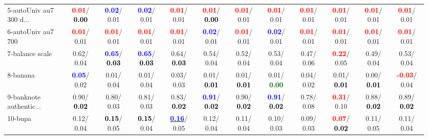\begin{table}[h]
\begin{center}
{\begin{tabular}{lc|c|c|c|c|c|c|c|c|c|c}
5-autoUniv au7 300 d... & \textcolor{red}{\textbf{  0.01}}/\textcolor{black}{\textbf{  0.00}} & \textcolor{blue}{\textbf{  0.02}}/  0.01 & \textcolor{blue}{\textbf{  0.02}}/  0.01 & \textcolor{red}{\textbf{  0.01}}/  0.01 & \textcolor{red}{\textbf{  0.01}}/\textcolor{black}{\textbf{  0.00}} & \textcolor{red}{\textbf{  0.01}}/  0.01 & \textcolor{red}{\textbf{  0.01}}/  0.01 & \textcolor{red}{\textbf{  0.01}}/  0.01 & \textcolor{red}{\textbf{  0.01}}/  0.01 & \textcolor{red}{\textbf{  0.01}}/  0.01 & \textcolor{red}{\textbf{  0.01}}/  0.01 \\
6-autoUniv au7 700 & \textcolor{red}{\textbf{  0.01}}/  0.01 & \textcolor{red}{\textbf{  0.01}}/  0.01 & \textcolor{red}{\textbf{  0.01}}/  0.01 & \textcolor{red}{\textbf{  0.01}}/  0.01 & \textcolor{blue}{\textbf{  0.02}}/  0.01 & \textcolor{red}{\textbf{  0.01}}/  0.01 & \textcolor{blue}{\textbf{  0.02}}/  0.01 & \textcolor{red}{\textbf{  0.01}}/  0.01 & \textcolor{red}{\textbf{  0.01}}/  0.01 & \textcolor{red}{\textbf{  0.01}}/  0.01 & \textcolor{red}{\textbf{  0.01}}/  0.01 \\
7-balance scale &   0.62/  0.04 & \textcolor{blue}{\textbf{  0.65}}/\textcolor{black}{\textbf{  0.03}} & \textcolor{blue}{\textbf{  0.65}}/\textcolor{black}{\textbf{  0.03}} &   0.64/\textcolor{black}{\textbf{  0.03}} &   0.54/  0.04 &   0.52/  0.04 &   0.53/  0.04 &   0.47/  0.06 & \textcolor{red}{\textbf{  0.22}}/  0.05 &   0.49/  0.04 &   0.53/  0.04 \\ \hline
8-banana & \textcolor{blue}{\textbf{  0.05}}/  0.02 &   0.01/  0.04 &   0.01/  0.04 &   0.03/  0.03 &   0.01/\textcolor{black}{\textbf{  0.01}} &   0.01/\textcolor{black}{\textbf{  0.01}} &   0.01/\textcolor{darkgreen}{\textbf{  0.00}} &   0.04/  0.02 &   0.01/\textcolor{black}{\textbf{  0.01}} &   0.00/\textcolor{black}{\textbf{  0.01}} & \textcolor{red}{\textbf{ -0.03}}/  0.04 \\
9-banknote authentic... &   0.90/\textcolor{black}{\textbf{  0.02}} &   0.80/  0.03 &   0.81/  0.03 &   0.83/\textcolor{black}{\textbf{  0.02}} & \textcolor{blue}{\textbf{  0.91}}/\textcolor{black}{\textbf{  0.02}} &   0.90/\textcolor{black}{\textbf{  0.02}} & \textcolor{blue}{\textbf{  0.91}}/\textcolor{black}{\textbf{  0.02}} &   0.78/  0.08 & \textcolor{red}{\textbf{  0.31}}/  0.10 &   0.88/\textcolor{black}{\textbf{  0.02}} &   0.89/\textcolor{black}{\textbf{  0.02}} \\
10-bupa &   0.12/  0.04 & \textcolor{black}{\textbf{  0.15}}/  0.05 & \textcolor{black}{\textbf{  0.15}}/  0.04 & \underline{\textcolor{blue}{\textbf{  0.16}}}/  0.05 &   0.12/  0.04 &   0.11/  0.04 &   0.10/  0.03 &   0.09/  0.03 & \textcolor{red}{\textbf{  0.07}}/\textcolor{black}{\textbf{  0.02}} &   0.11/  0.05 &   0.11/  0.04 \\

\end{tabular}}
\end{center}
\end{table}

